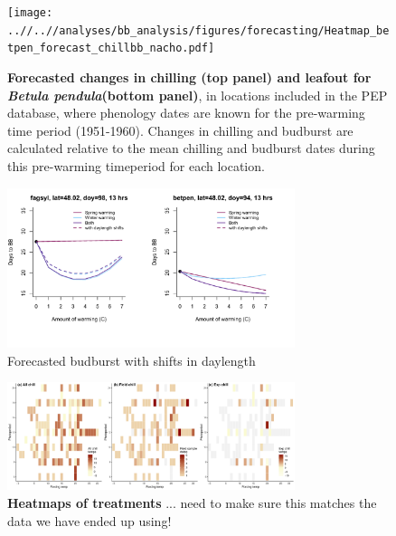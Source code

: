\documentclass{article}
\begin{document}
\begin{figure}[h!]
\centering
\noindent \texttt{[image: ..//..//analyses/bb\_analysis/figures/forecasting/Heatmap\_betpen\_forecast\_chillbb\_nacho.pdf]}
\caption{\textbf{Forecasted changes in chilling (top panel) and leafout for \emph{Betula pendula}(bottom panel)}, in locations included in the PEP database, where phenology dates are known for the pre-warming time period (1951-1960). Changes in chilling and budburst are calculated relative to the mean chilling and budburst dates during this pre-warming timeperiod for each location.} 
\label{fig:foremap}
\end{figure}
\begin{figure}[h!]
\centering
\noindent \includegraphics[width=0.75\textwidth]{..//..//analyses/bb_analysis/figures/forecasting/tempforecast_bothspp_PEPBB_wdl_utah.pdf}
\caption{Forecasted budburst with shifts in daylength}
\label{fig:foremap}
\end{figure}


\newpage
\begin{figure}[h!]
\centering
\noindent \includegraphics[width=0.75\textwidth]{..//..//analyses/bb_analysis/figures/studydesign_heat3panel.pdf}
\caption{\textbf{Heatmaps of treatments} ... need to make sure this matches the data we have ended up using!}
\label{fig:treatheatmaps} %
\end{figure}
\end{document}
